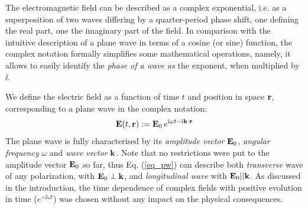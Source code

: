 The electromagnetic field can be described as a complex exponential, i.e. as a superposition of two waves differing by a quarter-period phase shift, one defining the real part, one the imaginary part of the field. In comparison with the intuitive description of a plane wave in terms of a cosine (or sine) function, the complex notation formally simplifies some mathematical operations, namely, it allows to easily identify the \textit{phase of a wave as} the exponent, when multiplied by $\ii$. 

We define the electric field as a function of time $t$ and position in space ${\mathbf{r}}$, corresponding to a plane wave in the complex notation:
\begin{equation} \mathbf{E}(t, {\mathbf{r}}) := \mathbf{E}_0\, e^{{\mathrm i}\omega t - {\mathrm i}{\mathbf{k}}\cdot{\mathbf{r}}} \label{eq_pw}\end{equation}
The plane wave is fully characterised by its \textit{amplitude vector} $\mathbf{E}_0$, \textit{angular frequency} $\omega$ and \textit{wave vector} ${\mathbf{k}}$. Note that no restrictions were put to the amplitude vector $\mathbf{E}_0$ so far, thus Eq. (\ref{eq_pw}) can describe both \textit{transverse} wave of any polarization, with $\mathbf{E}_0 \perp {\mathbf{k}}$, and \textit{longitudinal wave} with $\mathbf{E}_0 || {\mathbf{k}}$.  As discussed in the introduction, the time dependence of complex fields with positive evolution in time ($e^{+\ii\omega t}$)  was chosen without any impact on the physical consequences.

